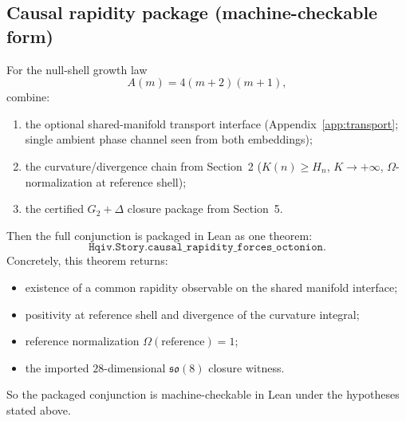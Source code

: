 \documentclass[11pt]{amsart}
\begin{document}
\subsection*{Causal rapidity package (machine-checkable form)}
For the null-shell growth law
\[
A(m)=4(m+2)(m+1),
\]
combine:
\begin{enumerate}
  \item the optional shared-manifold transport interface (Appendix~\ref{app:transport}; single ambient phase channel seen from both embeddings);
  \item the curvature/divergence chain from Section~2 (\(K(n)\ge H_n\), \(K\to+\infty\), \(\Omega\)-normalization at reference shell);
  \item the certified \(G_2+\Delta\) closure package from Section~5.
\end{enumerate}
Then the full conjunction is packaged in Lean as one theorem:
\[
\texttt{Hqiv.Story.causal\_rapidity\_forces\_octonion}.
\]
Concretely, this theorem returns:
\begin{itemize}
  \item existence of a common rapidity observable on the shared manifold interface;
  \item positivity at reference shell and divergence of the curvature integral;
  \item reference normalization \(\Omega(\text{reference})=1\);
  \item the imported \(28\)-dimensional \(\mathfrak{so}(8)\) closure witness.
\end{itemize}
So the packaged conjunction is machine-checkable in Lean under the hypotheses stated above.
\end{document}
